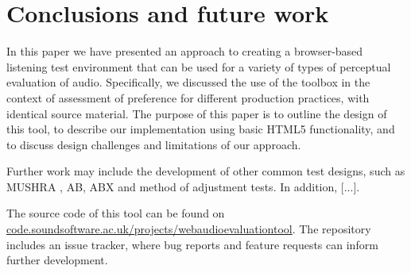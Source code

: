 \documentclass{article}
\begin{document}
\section{Conclusions and future work}\label{sec:conclusions}

In this paper we have presented an approach to creating a browser-based listening test environment that can be used for a variety of types of perceptual evaluation of audio. 
Specifically, we discussed the use of the toolbox in the context of assessment of preference for different production practices, with identical source material. 
The purpose of this paper is to outline the design of this tool, to describe our implementation using basic HTML5 functionality, and to discuss design challenges and limitations of our approach. %

Further work may include the development of other common test designs, such as MUSHRA \cite{mushra}, AB, ABX and method of adjustment tests. 
In addition, [...]. 



The source code of this tool can be found on \url{code.soundsoftware.ac.uk/projects/webaudioevaluationtool}. The repository includes an issue tracker, where bug reports and feature requests can inform further development. 



\end{document}
